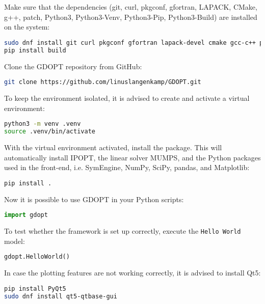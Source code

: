 \documentclass[12pt]{article}
\begin{document}
\begin{mdframed}[backgroundcolor=gray!10, roundcorner=10pt,
	linewidth=1pt]
	
	Make sure that the dependencies (git, curl, pkgconf, gfortran, LAPACK, CMake, g++, patch,
	Python3, Python3-Venv, Python3-Pip, Python3-Build) are installed on the system:
	
	\begin{lstlisting}[language=bash]
sudo dnf install git curl pkgconf gfortran lapack-devel cmake gcc-c++ python3 python3-pip python3-virtualenv patch
pip install build
	\end{lstlisting}
	
	Clone the GDOPT repository from GitHub:
	
	\begin{lstlisting}[language=bash]
git clone https://github.com/linuslangenkamp/GDOPT.git
	\end{lstlisting}
	
	To keep the environment isolated, it is advised to create and activate a
	virtual environment:
	
	\begin{lstlisting}[language=bash]
python3 -m venv .venv
source .venv/bin/activate
	\end{lstlisting}
	
	With the virtual environment activated, install the package. This will
	automatically install
	IPOPT\cite{wachter2006implementation}, the linear solver
	MUMPS\cite{amestoy2001fully}, and the Python packages used in the front-end,
	i.e. SymEngine\cite{symengine}, NumPy\cite{harris2020array},
	SciPy\cite{virtanen2020scipy}, pandas\cite{mckinney2010data}, and
	Matplotlib\cite{hunter2007matplotlib}:
	
	\begin{lstlisting}[language=bash]
pip install .
	\end{lstlisting}
	
	Now it is possible to use GDOPT in your Python scripts:
	\begin{lstlisting}[language=python]
import gdopt
	\end{lstlisting}
	
	To test whether the framework is set up correctly, execute the \texttt{Hello World} model:
	\begin{lstlisting}[language=python]
gdopt.HelloWorld()
	\end{lstlisting}

	In case the plotting features are not working correctly, it is advised to install Qt5:
	
	\begin{lstlisting}[language=bash]
pip install PyQt5
sudo dnf install qt5-qtbase-gui
	\end{lstlisting}
	
\end{mdframed}
\end{document}
